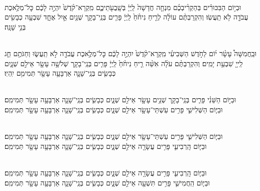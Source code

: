 \documentclass[twoside, openany, parskip=half, 11pt]{book}
\begin{document}
\\
וּבְי֣וֹם הַבִּכּוּרִ֗ים בְּהַקְרִ֨יבְכֶ֜ם מִנְחָ֤ה חֲדָשָׁה֙ לַֽיְיָ֔ בְּשָֽׁבֻעֹ֖תֵיכֶ֑ם מִֽקְרָא־קֹ֨דֶשׁ֙ יִהְיֶ֣ה לָכֶ֔ם כׇּל־מְלֶ֥אכֶת עֲבֹדָ֖ה לֹ֥א תַֽעֲשֽׂוּ׃ וְהִקְרַבְתֶּ֨ם עוֹלָ֜ה לְרֵ֤יחַ נִיחֹ֨חַ֙ לַֽיְיָ֔ פָּרִ֧ים בְּנֵֽי־בָקָ֛ר שְׁנַ֖יִם אַ֣יִל אֶחָ֑ד שִׁבְעָ֥ה כְבָשִׂ֖ים בְּנֵ֥י שָׁנָֽה׃


\\
וּבַֽחֲמִשָּׁה֩ עָשָׂ֨ר י֜וֹם לַחֹ֣דֶשׁ הַשְּׁבִיעִ֗י מִֽקְרָא־קֹ֨דֶשׁ֙ יִהְיֶ֣ה לָכֶ֔ם כׇּל־מְלֶ֥אכֶת עֲבֹדָ֖ה לֹ֣א תַֽעֲשׂ֑וּ וְחַגֹּתֶ֥ם חַ֛ג לַֽייָ֖ שִׁבְעַ֥ת יָמִֽים׃ וְהִקְרַבְתֶּ֨ם עֹלָ֜ה אִשֵּׁ֨ה רֵ֤יחַ נִיחֹ֨חַ֙ לַֽיְיָ֔ פָּרִ֧ים בְּנֵֽי־בָקָ֛ר שְׁלֹשָׁ֥ה עָשָׂ֖ר אֵילִ֣ם שְׁנָ֑יִם כְּבָשִׂ֧ים בְּנֵֽי־שָׁנָ֛ה אַרְבָּעָ֥ה עָשָׂ֖ר תְּמִימִ֥ם יִֽהְיֽוּ׃



\\
וּבַיּ֣וֹם הַשֵּׁנִ֗י פָּרִ֧ים בְּנֵֽי־בָקָ֛ר שְׁנֵ֥ים עָשָׂ֖ר אֵילִ֣ם שְׁנָ֑יִם כְּבָשִׂ֧ים בְּנֵֽי־שָׁנָ֛ה אַרְבָּעָ֥ה עָשָׂ֖ר תְּמִימִֽם׃
\\
וּבַיּ֧וֹם הַשְּׁלִישִׁ֛י פָּרִ֥ים עַשְׁתֵּי־עָשָׂ֖ר אֵילִ֣ם שְׁנָ֑יִם כְּבָשִׂ֧ים בְּנֵֽי־שָׁנָ֛ה אַרְבָּעָ֥ה עָשָׂ֖ר תְּמִימִֽם׃



\\
וּבַיּ֧וֹם הַשְּׁלִישִׁ֛י פָּרִ֥ים עַשְׁתֵּי־עָשָׂ֖ר אֵילִ֣ם שְׁנָ֑יִם כְּבָשִׂ֧ים בְּנֵֽי־שָׁנָ֛ה אַרְבָּעָ֥ה עָשָׂ֖ר תְּמִימִֽם׃
\\
וּבַיּ֧וֹם הָֽרְבִיעִ֛י פָּרִ֥ים עֲשָׂרָ֖ה אֵילִ֣ם שְׁנָ֑יִם כְּבָשִׂ֧ים בְּנֵֽי־שָׁנָ֛ה אַרְבָּעָ֥ה עָשָׂ֖ר תְּמִימִֽם׃



\\
וּבַיּ֧וֹם הָֽרְבִיעִ֛י פָּרִ֥ים עֲשָׂרָ֖ה אֵילִ֣ם שְׁנָ֑יִם כְּבָשִׂ֧ים בְּנֵֽי־שָׁנָ֛ה אַרְבָּעָ֥ה עָשָׂ֖ר תְּמִימִֽם׃
\\
וּבַיּ֧וֹם הַֽחֲמִישִׁ֛י פָּרִ֥ים תִּשְׁעָ֖ה אֵילִ֣ם שְׁנָ֑יִם כְּבָשִׂ֧ים בְּנֵֽי־שָׁנָ֛ה אַרְבָּעָ֥ה עָשָׂ֖ר תְּמִימִֽם׃
\end{document}
